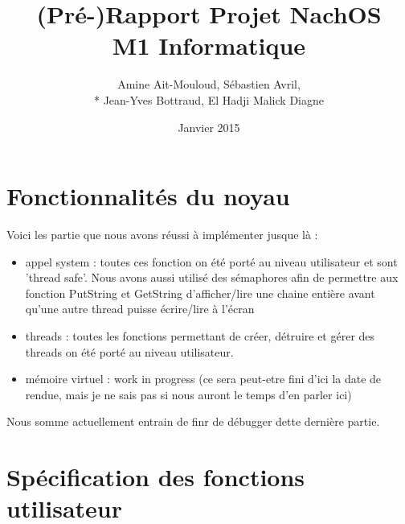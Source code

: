 \documentclass{article}
\begin{document}
\title {(Pré-)Rapport Projet NachOS \\ M1 Informatique}
\author{Amine Ait-Mouloud, Sébastien Avril,\\* Jean-Yves Bottraud, El Hadji Malick Diagne}
\date{Janvier 2015}
\maketitle

\tableofcontents{}
\newpage
\section{Fonctionnalités du noyau}
	Voici les partie que nous avons réussi à implémenter jusque là :
	\begin{itemize}
		\item appel system : toutes ces fonction on été porté au niveau utilisateur et sont 'thread safe'. Nous avons aussi utilisé des sémaphores afin de permettre aux fonction PutString et GetString d'afficher/lire une chaine entière avant qu'une autre thread puisse écrire/lire à l'écran
		\item threads : toutes les fonctions permettant de créer, détruire et gérer des threads on été porté au niveau utilisateur.
		\item mémoire virtuel : work in progress (ce sera peut-etre fini d'ici la date de rendue, mais je ne sais pas si nous auront le temps d'en parler ici)
	\end{itemize}
	Nous somme actuellement entrain de finr de débugger dette dernière partie.

\section{Spécification des fonctions utilisateur}
\end{document}
